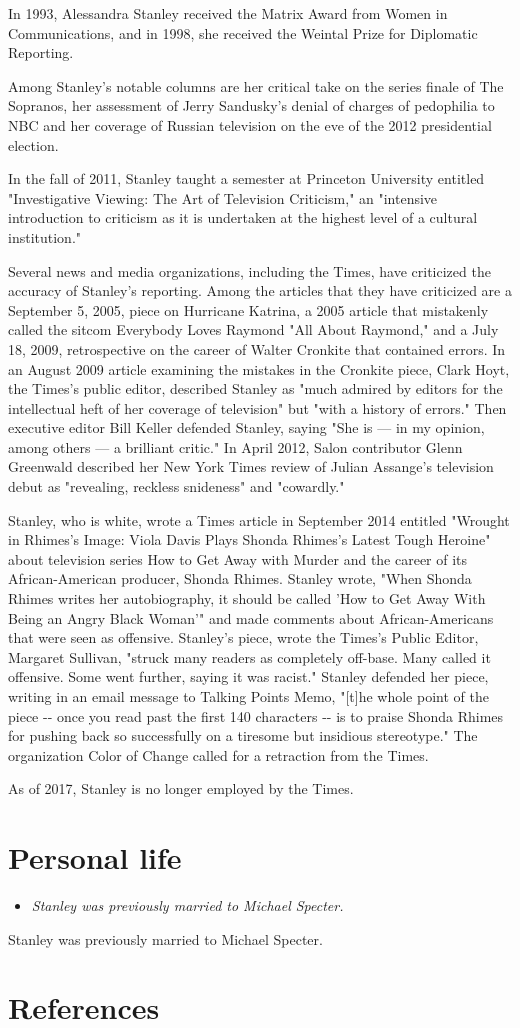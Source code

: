 In 1993, Alessandra Stanley received the Matrix Award from Women in
Communications, and in 1998, she received the Weintal Prize for
Diplomatic Reporting.

Among Stanley's notable columns are her critical take on the series
finale of The Sopranos, her assessment of Jerry Sandusky's denial of
charges of pedophilia to NBC and her coverage of Russian television on
the eve of the 2012 presidential election.

In the fall of 2011, Stanley taught a semester at Princeton University
entitled "Investigative Viewing: The Art of Television Criticism," an
"intensive introduction to criticism as it is undertaken at the highest
level of a cultural institution."

Several news and media organizations, including the Times, have
criticized the accuracy of Stanley's reporting. Among the articles that
they have criticized are a September 5, 2005, piece on Hurricane
Katrina, a 2005 article that mistakenly called the sitcom Everybody
Loves Raymond "All About Raymond," and a July 18, 2009, retrospective on
the career of Walter Cronkite that contained errors. In an August 2009
article examining the mistakes in the Cronkite piece, Clark Hoyt, the
Times's public editor, described Stanley as "much admired by editors for
the intellectual heft of her coverage of television" but "with a history
of errors." Then executive editor Bill Keller defended Stanley, saying
"She is --- in my opinion, among others --- a brilliant critic." In
April 2012, Salon contributor Glenn Greenwald described her New York
Times review of Julian Assange's television debut as "revealing,
reckless snideness" and "cowardly."

Stanley, who is white, wrote a Times article in September 2014 entitled
"Wrought in Rhimes's Image: Viola Davis Plays Shonda Rhimes's Latest
Tough Heroine" about television series How to Get Away with Murder and
the career of its African-American producer, Shonda Rhimes. Stanley
wrote, "When Shonda Rhimes writes her autobiography, it should be called
'How to Get Away With Being an Angry Black Woman'" and made comments
about African-Americans that were seen as offensive. Stanley's piece,
wrote the Times's Public Editor, Margaret Sullivan, "struck many readers
as completely off-base. Many called it offensive. Some went further,
saying it was racist." Stanley defended her piece, writing in an email
message to Talking Points Memo, "{[}t{]}he whole point of the piece -\/-
once you read past the first 140 characters -\/- is to praise Shonda
Rhimes for pushing back so successfully on a tiresome but insidious
stereotype." The organization Color of Change called for a retraction
from the Times.

As of 2017, Stanley is no longer employed by the Times.

\section{Personal life}\label{personal-life}

\begin{itemize}
\item
  \emph{Stanley was previously married to Michael Specter.}
\end{itemize}

Stanley was previously married to Michael Specter.

\section{References}\label{references}
